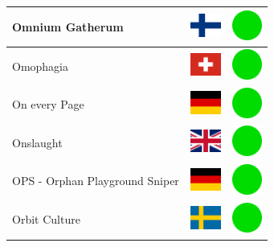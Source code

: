 \documentclass[12pt, a4paper, twoside]{report}
\begin{document}
\begin{center}
\begin{longtable}{|p{5cm}|p{2cm}|p{2cm}|}
Omnium Gatherum & \includegraphics[width=1cm]{4x3/fi} & \includegraphics[width=1cm]{likes/y} \\ \hline
Omophagia & \includegraphics[width=1cm]{4x3/ch} & \includegraphics[width=1cm]{likes/y} \\ \hline
On every Page & \includegraphics[width=1cm]{4x3/de} & \includegraphics[width=1cm]{likes/y} \\ \hline
Onslaught & \includegraphics[width=1cm]{4x3/gb} & \includegraphics[width=1cm]{likes/y} \\ \hline
OPS - Orphan Playground Sniper & \includegraphics[width=1cm]{4x3/de} & \includegraphics[width=1cm]{likes/y} \\ \hline
Orbit Culture & \includegraphics[width=1cm]{4x3/se} & \includegraphics[width=1cm]{likes/y} \\ \hline

\end{longtable}
\end{center}
\end{document}
